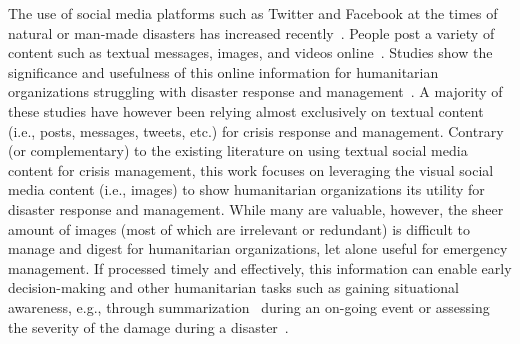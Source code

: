 \documentclass{iscram}
\begin{document}
The use of social media platforms such as Twitter and Facebook at the times of natural or man-made disasters has increased recently~\parencite{starbird2010chatter,hughes2009twitter}. People post a variety of content such as textual messages, images, and videos online~\parencite{chen2013understanding,imran2015processing}. Studies show the significance and usefulness of this online information for humanitarian organizations struggling with disaster response and management~\parencite{petersinvestigating,imran2013extracting,daly2016mining}.
A majority of these studies have however been relying almost exclusively on textual content (i.e., posts, messages, tweets, etc.) for crisis response and management. Contrary (or complementary) to the existing literature on using textual social media content for crisis management, this work focuses on leveraging the visual social media content (i.e., images) to show humanitarian organizations its utility for disaster response and management. While many are valuable, however, the sheer amount of images (most of which are irrelevant or redundant) is difficult to manage and digest for humanitarian organizations, let alone useful for emergency management. If processed timely and effectively, this information can enable early decision-making and other humanitarian tasks such as gaining situational awareness, e.g., through summarization~\parencite{rudra2016summarizing} during an on-going event or assessing the severity of the damage during a disaster~\parencite{ofli2016combining}.
\end{document}
